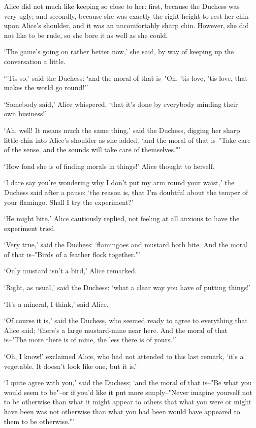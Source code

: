 \documentclass[statementpaper,twoside,openany]{memoir}
\begin{document}
Alice did not much like keeping so close to her: first, because the Duchess was very ugly; and secondly, because she was exactly the right height to rest her chin upon Alice's shoulder, and it was an uncomfortably sharp chin. However, she did not like to be rude, so she bore it as well as she could.

`The game's going on rather better now,' she said, by way of keeping up the conversation a little.

`'Tis so,' said the Duchess: `and the moral of that is--"Oh, 'tis love, 'tis love, that makes the world go round!"'

`Somebody said,' Alice whispered, `that it's done by everybody minding their own business!'

`Ah, well! It means much the same thing,' said the Duchess, digging her sharp little chin into Alice's shoulder as she added, `and the moral of that is--"Take care of the sense, and the sounds will take care of themselves."'

`How fond she is of finding morals in things!' Alice thought to herself.

`I dare say you're wondering why I don't put my arm round your waist,' the Duchess said after a pause: `the reason is, that I'm doubtful about the temper of your flamingo. Shall I try the experiment?'

`He might bite,' Alice cautiously replied, not feeling at all anxious to have the experiment tried.

`Very true,' said the Duchess: `flamingoes and mustard both bite. And the moral of that is--"Birds of a feather flock together."'

`Only mustard isn't a bird,' Alice remarked.

`Right, as usual,' said the Duchess: `what a clear way you have of putting things!'

`It's a mineral, I think,' said Alice.

`Of course it is,' said the Duchess, who seemed ready to agree to everything that Alice said; `there's a large mustard-mine near here. And the moral of that is--"The more there is of mine, the less there is of yours."'

`Oh, I know!' exclaimed Alice, who had not attended to this last remark, `it's a vegetable. It doesn't look like one, but it is.'

`I quite agree with you,' said the Duchess; `and the moral of that is--"Be what you would seem to be"--or if you'd like it put more simply--"Never imagine yourself not to be otherwise than what it might appear to others that what you were or might have been was not otherwise than what you had been would have appeared to them to be otherwise."'
\end{document}
